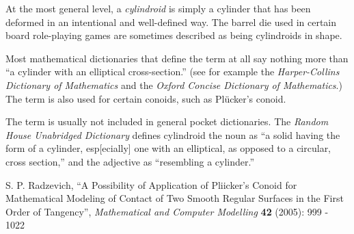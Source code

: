 \documentclass[12pt]{article}
\begin{document}
At the most general level, a {\em cylindroid} is simply a cylinder that has been deformed in an intentional and well-defined way. The barrel die used in certain board role-playing games are sometimes described as being cylindroids in shape. 

Most mathematical dictionaries that define the term at all say nothing more than ``a cylinder with an elliptical cross-section.'' (see for example the {\it Harper-Collins Dictionary of Mathematics} and the {\it Oxford Concise Dictionary of Mathematics}.) The term is also used for certain conoids, such as Pl\"ucker's conoid.

The term is usually not included in general pocket dictionaries. The {\it Random House Unabridged Dictionary} defines cylindroid the noun as ``a solid having the form of a cylinder, esp[ecially] one with an elliptical, as opposed to a circular, cross section,'' and the adjective as ``resembling a cylinder.''

\begin{thebibliography}{1}
 S. P. Radzevich, ``A Possibility of Application of Pliicker's Conoid for Mathematical Modeling of Contact of Two Smooth Regular Surfaces in the First Order of Tangency'', {\it Mathematical and Computer Modelling} {\bf 42} (2005): 999 - 1022
\end{thebibliography}
\end{document}
